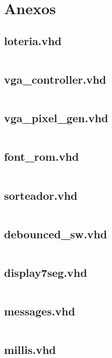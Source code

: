 \documentclass[12pt]{article}
\begin{document}
\clearpage
\section{Anexos}
\subsection{loteria.vhd}
\label{subsec:loteria}
\inputminted{vhdl}{code/loteria.vhd}
\subsection{vga\_controller.vhd}
\label{subsec:vga_controller}
\inputminted{vhdl}{code/vga_controller.vhd}
\subsection{vga\_pixel\_gen.vhd}
\label{subsec:vga_pixel_gen}
\inputminted{vhdl}{code/vga_pixel_gen.vhd}
\subsection{font\_rom.vhd}
\label{subsec:font_rom}
\inputminted{vhdl}{code/font_rom.vhd}
\subsection{sorteador.vhd}
\label{subsec:sorteador}
\inputminted{vhdl}{code/sorteador.vhd}
\subsection{debounced\_sw.vhd}
\label{subsec:debounce-sw}
\inputminted{vhdl}{code/debounced_sw.vhd}
\subsection{display7seg.vhd}
\label{subsec:disp7seg}
\inputminted{vhdl}{code/display7seg.vhd}
\subsection{messages.vhd}
\label{subsec:message}
\inputminted{vhdl}{code/messages.vhd}
\subsection{millis.vhd}
\label{subsec:millis}
\inputminted{vhdl}{code/millis.vhd}
\end{document}
